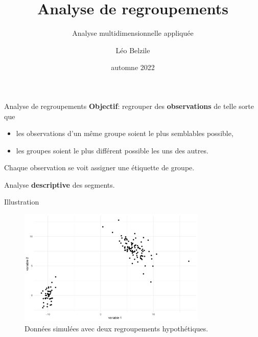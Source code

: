 \documentclass[
  ignorenonframetext,
]{beamer}
\title{Analyse de regroupements}
\subtitle{Analyse multidimensionnelle appliquée}
\author{Léo Belzile}
\date{automne 2022}
\institute{HEC Montréal}
\providecommand{\tightlist}{%
  \setlength{\itemsep}{0pt}\setlength{\parskip}{0pt}}\usepackage{longtable,booktabs,array}
\begin{document}
\frame{\titlepage}
\ifdefined\Shaded\renewenvironment{Shaded}{\begin{tcolorbox}[enhanced, borderline west={3pt}{0pt}{shadecolor}, interior hidden, frame hidden, boxrule=0pt, sharp corners, breakable]}{\end{tcolorbox}}\fi

\begin{frame}{Analyse de regroupements}
\protect\hypertarget{analyse-de-regroupements}{}
\textbf{Objectif}: regrouper des \textbf{observations} de telle sorte
que

\begin{itemize}
\tightlist
\item
  les observations d'un même groupe soient le plus semblables possible,
\item
  les groupes soient le plus différent possible les uns des autres.
\end{itemize}

Chaque observation se voit assigner une étiquette de groupe.

Analyse \textbf{descriptive} des segments.
\end{frame}

\begin{frame}{Illustration}
\protect\hypertarget{illustration}{}
\begin{figure}

{\centering \includegraphics[width=0.8\textwidth,height=\textheight]{MATH60602-diapos11_files/figure-beamer/fig-regroupements-bidons-1.pdf}

}

\caption{\label{fig-regroupements-bidons}Données simulées avec deux
regroupements hypothétiques.}

\end{figure}
\end{frame}
\end{document}
